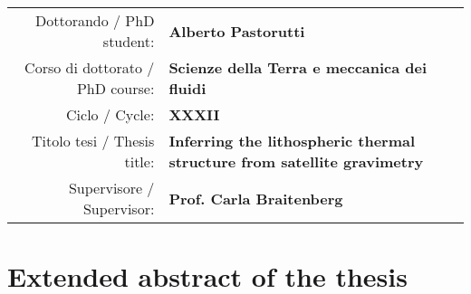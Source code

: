 


\pagestyle{empty}


\begin{adjustbox}{center}
    \begin{tabular}{rp{}}
        \toprule
        Dottorando / PhD student: & \textbf{Alberto Pastorutti} \\
        Corso di dottorato / PhD course: & \textbf{Scienze della Terra e meccanica dei fluidi} \\
        Ciclo / Cycle: & \textbf{XXXII} \\
        Titolo tesi / Thesis title: & \textbf{Inferring the lithospheric thermal structure from satellite gravimetry} \\
        Supervisore / Supervisor: & \textbf{Prof. Carla Braitenberg} \\
        \bottomrule
    \end{tabular}
\end{adjustbox}

\section*{Extended abstract of the thesis}





